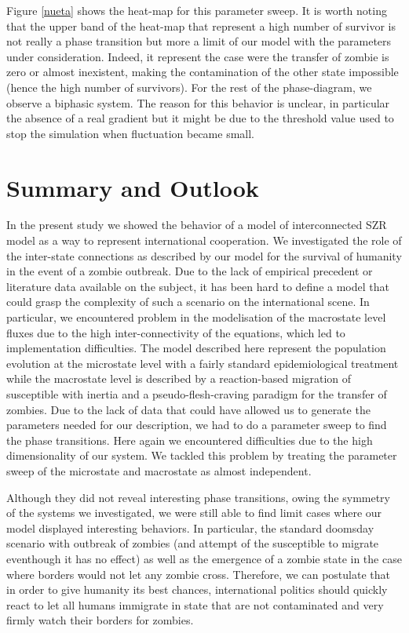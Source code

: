 \documentclass[11pt]{article} %
\begin{document}
Figure \ref{nueta} shows the heat-map for this parameter sweep. It is worth noting that the upper band of the heat-map that represent a high number of survivor is not really a phase transition but more a limit of our model with the parameters under consideration. Indeed, it represent the case were the transfer of zombie is zero or almost inexistent, making the contamination of the other state impossible (hence the high number of survivors). For the rest of the phase-diagram, we observe a biphasic system. The reason for this behavior is unclear, in particular the absence of a real gradient but it might be due to the threshold value used to stop the simulation when fluctuation became small. 




\newpage
\section{Summary and Outlook}\indent

In the present study we showed the behavior of a model of interconnected SZR model as a way to represent international cooperation. We investigated the role of the inter-state connections as described by our model for the survival of humanity in the event of a zombie outbreak. Due to the lack of empirical precedent or literature data available on the subject, it has been hard to define a model that could grasp the complexity of such a scenario on the international scene. In particular, we encountered problem in the modelisation of the macrostate level fluxes due to the high inter-connectivity of the equations, which led to implementation difficulties. The model described here represent the population evolution at the microstate level with a fairly standard epidemiological treatment while the macrostate level is described by a reaction-based migration of susceptible with inertia and a pseudo-flesh-craving paradigm for the transfer of zombies. Due to the lack of data that could have allowed us to generate the parameters needed for our description, we had to do a parameter sweep to find the phase transitions. Here again we encountered difficulties due to the high dimensionality of our system. We tackled this problem by treating the parameter sweep of the microstate and macrostate as almost independent. 

Although they did not reveal interesting phase transitions, owing the symmetry of the systems we investigated, we were still able to find limit cases where our model displayed interesting behaviors. In particular, the standard doomsday scenario with outbreak of zombies (and attempt of the susceptible to migrate eventhough it has no effect) as well as the emergence of a zombie state in the case where borders would not let any zombie cross. Therefore, we can postulate that in order to give humanity its best chances, international politics should quickly react to let all humans immigrate in state that are not contaminated and very firmly watch their borders for zombies.
  
\end{document}
